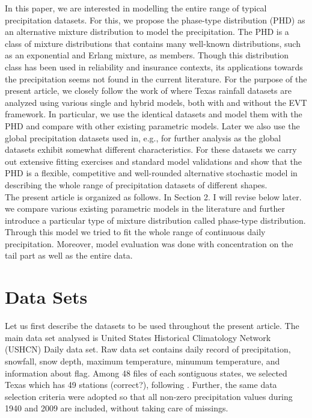 \documentclass[12pt]{article}\usepackage[]{graphicx}\usepackage[]{color}
\newcommand{\cred}{ \color{red}}
\begin{document}
In this paper, we are interested in modelling the entire range of typical precipitation datasets. For this, we propose the phase-type distribution (PHD) as an alternative mixture distribution to model the precipitation. The PHD is a class of mixture distributions that contains many well-known distributions, such as an exponential and Erlang mixture,  as members. Though this distribution class has been used in reliability and insurance contexts, its applications towards the precipitation seems not found in the current literature. For the purpose of the present article, we closely follow the work of \cite{li2012simulation} where Texas rainfall datasets are analyzed using various single and hybrid models, both with and without the EVT framework. In particular, we use the identical datasets and model them with the PHD and compare with other existing parametric models. Later we also use the global precipitation datasets used in, e.g.,  \cite{papalexiou2012entropy, papalexiou2013extreme} for further analysis as the global datasets exhibit somewhat different characteristics.
For these datasets we carry out extensive fitting exercises and standard model validations and show that the PHD is a flexible, competitive and well-rounded alternative stochastic model in describing the whole range of precipitation datasets of different shapes. \\

The present article is organized as follows. In Section 2. {\cred I will revise below later.}
we compare various existing parametric models in the literature and further introduce a particular type of mixture distribution called phase-type distribution. Through this model we tried to fit the whole range of continuous daily precipitation. Moreover, model evaluation was done with concentration on the tail part as well as the entire data. 


\section{Data Sets}


Let us first describe the datasets to be used throughout the present article. The main data set analysed is United States Historical Climatology Network (USHCN) Daily data set. Raw data set contains daily record of precipitation, snowfall, snow depth, maximum temperature, minumum temperature, and information about flag. Among 48 files of each sontiguous states, we selected Texas which has {\cred 49 stations (correct?)}, following \cite{li2012simulation}. Further, the same data selection criteria were adopted so that all non-zero precipitation values during 1940 and 2009 are included, without taking care of missings. \\
\end{document}
